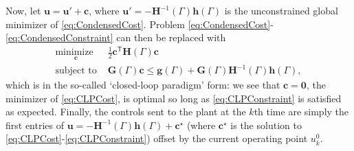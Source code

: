 \documentclass[letterpaper, 10 pt, conference]{ieeeconf}  %
\newcommand{\tran}{^{\mathsf{T}}}
\begin{document}
Now, let $\mathbf{u} = \mathbf{u'} + \mathbf{c}$, where $\mathbf{u'} = -\mathbf{H}^{-1}(\Gamma)\mathbf{h}(\Gamma)$ is the unconstrained global minimizer of \eqref{eq:CondensedCost}. Problem \eqref{eq:CondensedCost}-\eqref{eq:CondensedConstraint} can then be replaced with 
\begin{align}
\underset{\mathbf{c}}{\text{minimize }} & \frac{1}{2}\mathbf{c}\tran \mathbf{H}(\Gamma) \mathbf{c} \label{eq:CLPCost} \\
\text{subject to } &\mathbf{G}(\Gamma)\mathbf{c} \leq \mathbf{g}(\Gamma) + \mathbf{G}(\Gamma)\mathbf{H}^{-1}(\Gamma)\mathbf{h}(\Gamma), \label{eq:CLPConstraint}
\end{align}
which is in the so-called `closed-loop paradigm' form: we see that $\mathbf{c} = \mathbf{0}$, the minimizer of \eqref{eq:CLPCost}, is optimal so long as \eqref{eq:CLPConstraint} is satisfied as expected. Finally, the controls sent to the plant at the $k$th time are simply the first entries of $\mathbf{u} = -\mathbf{H}^{-1}(\Gamma)\mathbf{h}(\Gamma) + \mathbf{c}^\star$ (where $\mathbf{c}^\star$ is the solution to \eqref{eq:CLPCost}-\eqref{eq:CLPConstraint}) offset by the current operating point $u^0_k$. 
\end{document}
